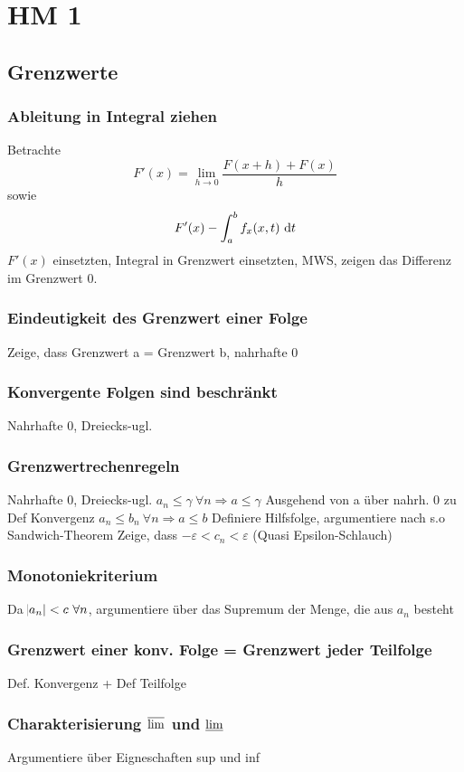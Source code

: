\chapter{HM 1}
\section{Grenzwerte}
\subsection{Ableitung in Integral ziehen}
Betrachte
\begin{equation*}
    F'(x) = \lim_{h \to 0} \frac{F(x + h) + F(x)}{h}
\end{equation*}
sowie
\begin{equation*}
    F'(x) - \int_a^b f_x(x,t) \text{ d}t
\end{equation*}
$F'(x)$ einsetzten, Integral in Grenzwert einsetzten, MWS,
zeigen das Differenz im Grenzwert $0$.

\subsection{Eindeutigkeit des Grenzwert einer Folge }
 Zeige, dass Grenzwert a = Grenzwert b, nahrhafte 0
\subsection{Konvergente Folgen sind beschränkt }
 Nahrhafte 0, Dreiecks-ugl.
\subsection{Grenzwertrechenregeln }
 Nahrhafte 0, Dreiecks-ugl.
$a_n \leq \gamma\ \forall n \Rightarrow a \leq \gamma$
 Ausgehend von a über nahrh. 0 zu Def Konvergenz
$a_n \leq b_n\ \forall n \Rightarrow a\leq b$
 Definiere Hilfsfolge, argumentiere nach s.o
Sandwich-Theorem
 Zeige, dass $-\varepsilon < c_n < \varepsilon$  (Quasi Epsilon-Schlauch)
\subsection{Monotoniekriterium }
 Da $\abs{a_n} < c\ \forall n$, argumentiere über das Supremum der Menge, die aus $a_n$ besteht
\subsection{Grenzwert einer konv. Folge = Grenzwert jeder Teilfolge }
 Def. Konvergenz + Def Teilfolge
\subsection{Charakterisierung $\varlimsup$ und $\varliminf$ }
 Argumentiere über Eigneschaften sup und inf
